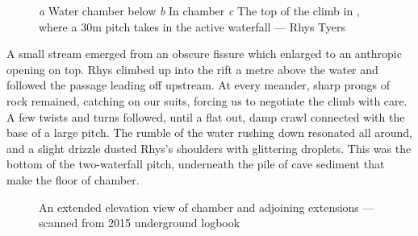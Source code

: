     \begin{figure}[t!]
        \checkoddpage \ifoddpage \forcerectofloat \else \forceversofloat \fi
        \centering
        \begin{subfigure}[t]{0.68\textwidth}
            \centering
            \caption{}\label{water chamber below helm's deep}
        \end{subfigure}
        \hfill
        \begin{subfigure}[t]{0.303\textwidth}
            \centering
            \caption{} \label{HelmsDeep}
        \end{subfigure}

        \vspace{0.3cm}
        
        \begin{subfigure}[t]{\textwidth}
            \centering
            \caption{} \label{Touching the Void 1}
        \end{subfigure}
        
        \caption{
            \emph{a} Water chamber below \protect{}
            \emph{b} In \protect{} chamber
            \emph{c} The top of the climb in \protect{}, where a 30m pitch takes in the active waterfall --- Rhys Tyers
        }
    \end{figure}

    A small stream emerged from an obscure fissure which enlarged to an anthropic opening on top. Rhys climbed up into the rift a metre above the water and followed the passage leading off upstream. At every meander, sharp prongs of rock remained, catching on our suits, forcing us to negotiate the climb with care. A few twists and turns followed, until a flat out, damp crawl connected with the base of a large pitch. The rumble of the water rushing down resonated all around, and a slight drizzle dusted Rhys's shoulders with glittering droplets. This was the bottom of the two-waterfall pitch, underneath the pile of  cave sediment that make the floor of  chamber.

    \begin{figure}[t!]
        \checkoddpage \ifoddpage \forcerectofloat \else \forceversofloat \fi
        \centering

        \caption{An extended elevation view of \protect{} chamber and adjoining \protect{} extensions ---scanned from 2015 underground logbook}
        \label{helms deep}
         
    \end{figure}

